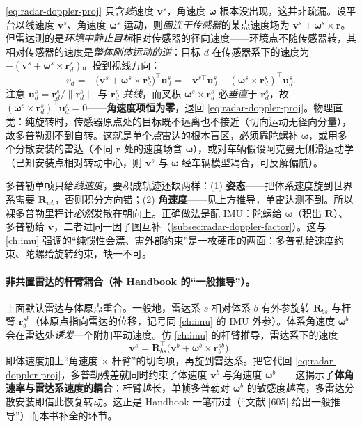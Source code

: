 \begin{derivation}
\cref{eq:radar-doppler-proj} 只含\emph{线}速度 $\mathbf v^s$，角速度 $\boldsymbol\omega$ 根本没出现，这并非疏漏。设平台以线速度 $\mathbf v^s$、角速度 $\boldsymbol\omega^s$ 运动，则\emph{固连于传感器}的某点速度场为 $\mathbf v^s+\boldsymbol\omega^s\times\mathbf r$。但雷达测的是\emph{环境中静止目标}相对传感器的径向速度——环境点不随传感器转，其相对传感器的速度是\emph{整体刚体运动的逆}：目标 $d$ 在传感器系下的速度为 $-(\mathbf v^s+\boldsymbol\omega^s\times\mathbf r_d^s)$。投到视线方向：
\[
  v_d=-\big(\mathbf v^s+\boldsymbol\omega^s\times\mathbf r_d^s\big)^\top\mathbf u_d^s
   =-\mathbf v^{s\top}\mathbf u_d^s-(\boldsymbol\omega^s\times\mathbf r_d^s)^\top\mathbf u_d^s.
\]
注意 $\mathbf u_d^s=\mathbf r_d^s/\|\mathbf r_d^s\|$ 与 $\mathbf r_d^s$ \emph{共线}，而叉积 $\boldsymbol\omega^s\times\mathbf r_d^s$ 必\emph{垂直}于 $\mathbf r_d^s$，故 $(\boldsymbol\omega^s\times\mathbf r_d^s)^\top\mathbf u_d^s=0$——\textbf{角速度项恒为零}，退回 \cref{eq:radar-doppler-proj}。物理直觉：纯旋转时，传感器原点处的目标既不远离也不接近（切向运动无径向分量），故多普勒测不到自转。这就是单个\emph{点}雷达的根本盲区，必须靠陀螺补 $\boldsymbol\omega$，或用多个分散安装的雷达（不同 $\mathbf r$ 处的速度场含 $\boldsymbol\omega$），或对车辆假设阿克曼无侧滑运动学（已知安装点相对转动中心，则 $\mathbf v^s$ 与 $\boldsymbol\omega$ 经车辆模型耦合，可反解偏航\cite{carlone2026handbook}）。
\end{derivation}

\begin{pitfall}
多普勒单帧只给\emph{线速度}，要积成轨迹还缺两样：(1) \textbf{姿态}——把体系速度旋到世界系需要 $\mathbf R_{wb}$，否则积分方向错；(2) \textbf{角速度}——见上方推导，单雷达测不到。所以裸多普勒里程计\emph{必然}发散在朝向上。正确做法是配 IMU：陀螺给 $\boldsymbol\omega$（积出 $\mathbf R$）、多普勒给 $\mathbf v$，二者进同一因子图互补（\cref{subsec:radar-doppler-factor}）。这与 \cref{ch:imu} 强调的“纯惯性会漂、需外部约束”是一枚硬币的两面：多普勒给速度约束、陀螺给旋转约束，缺一不可。
\end{pitfall}

\paragraph{非共置雷达的杆臂耦合（补 Handbook 的“一般推导”）。}
上面默认雷达与体原点重合。一般地，雷达系 $s$ 相对体系 $b$ 有外参旋转 $\mathbf R_{bs}$ 与杆臂 $\mathbf r_b^{sb}$（体原点指向雷达的位移，记号同 \cref{ch:imu} 的 IMU 外参）。体系角速度 $\boldsymbol\omega^b$ 会在雷达处\emph{诱发}一个附加平动速度。仿 \cref{ch:imu} 的杆臂推导，雷达系下的速度
\begin{equation}
  \mathbf v^s=\mathbf R_{bs}^\top\big(\mathbf v^b+\boldsymbol\omega^b\times\mathbf r_b^{sb}\big),
  \label{eq:radar-leverarm}
\end{equation}
即体速度加上“角速度 $\times$ 杆臂”的切向项，再旋到雷达系。把它代回 \cref{eq:radar-doppler-proj}，多普勒残差就同时约束了体速度 $\mathbf v^b$ 与角速度 $\boldsymbol\omega^b$——这揭示了\textbf{体角速率与雷达系速度的耦合}：杆臂越长，单帧多普勒对 $\boldsymbol\omega^b$ 的敏感度越高，多雷达分散安装即借此恢复转动。这正是 Handbook 一笔带过（“文献 [605] 给出一般推导”）而本书补全的环节。


